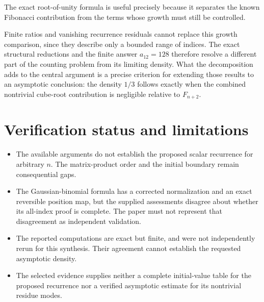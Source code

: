 \documentclass[11pt]{article}
\begin{document}
The exact root-of-unity formula is useful precisely because it separates the known Fibonacci contribution from the terms whose growth must still be controlled.

Finite ratios and vanishing recurrence residuals cannot replace this growth comparison, since they describe only a bounded range of indices. The exact structural reductions and the finite answer $a_{12}=128$ therefore resolve a different part of the counting problem from its limiting density. What the decomposition adds to the central argument is a precise criterion for extending those results to an asymptotic conclusion: the density $1/3$ follows exactly when the combined nontrivial cube-root contribution is negligible relative to $F_{n+2}$.

\section{Verification status and limitations}
\begin{itemize}
\item The available arguments do not establish the proposed scalar recurrence for arbitrary $n$. The matrix-product order and the initial boundary remain consequential gaps.
\item The Gaussian-binomial formula has a corrected normalization and an exact reversible position map, but the supplied assessments disagree about whether its all-index proof is complete. The paper must not represent that disagreement as independent validation.
\item The reported computations are exact but finite, and were not independently rerun for this synthesis. Their agreement cannot establish the requested asymptotic density.
\item The selected evidence supplies neither a complete initial-value table for the proposed recurrence nor a verified asymptotic estimate for its nontrivial residue modes.
\end{itemize}
\end{document}

